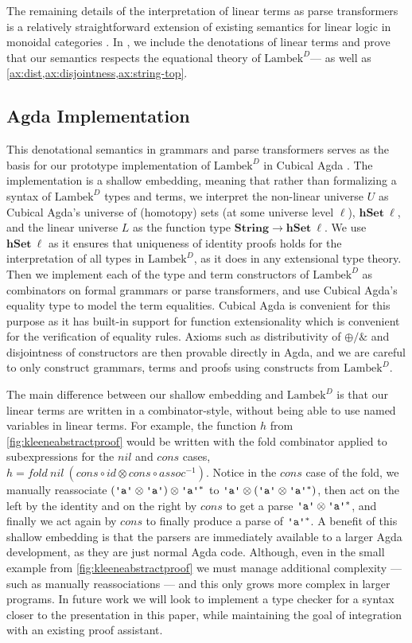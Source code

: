 \documentclass[acmsmall,nonacm]{acmart}
\newcommand{\StringSem}{\mathbf{String}}
\newcommand{\hSet}{\mathbf{hSet}}
\newcommand{\theoryabbv}{$\textrm{Lambek}^D$\xspace}
\newcommand{\literal}[1]{\texttt{\textquotesingle#1\textquotesingle}}
\newcommand{\agdalogo}{%
  \usebox{\logoagdabox}}%
\newcommand{\zenodolink}{https://zenodo.org/records/15049780}
\newcommand{\Agda}{\href{\zenodolink}{\agdalogo}}
\begin{document}
The remaining details of the interpretation of linear terms as parse
transformers is a relatively straightforward extension of existing semantics for
linear logic in monoidal categories \cite{seely89}. In
\fi, we include the denotations
of linear terms and prove that our semantics respects the equational theory of
\theoryabbv --- as well as \cref{ax:dist,ax:disjointness,ax:string-top}.

\subsection{Agda Implementation \Agda}
\label{subsec:impl}
This denotational semantics in grammars and parse transformers serves
as the basis for our prototype implementation of \theoryabbv in
Cubical Agda \cite{schaefer_2025_15243560}. The implementation is a shallow embedding, meaning that
rather than formalizing a syntax of \theoryabbv types and terms, we interpret
the non-linear universe $U$ as Cubical Agda's universe of (homotopy) sets (at
some universe level $\ell$), $\hSet~\ell$, and the linear universe $L$ as the
function type
$\StringSem \to \hSet~\ell$. We use $\hSet~\ell$ as it ensures that uniqueness of identity proofs holds for the interpretation of all types in \theoryabbv, as it does in any extensional type theory. Then we implement each of the type and
term constructors of \theoryabbv as combinators on formal grammars or
parse transformers, and use Cubical Agda's equality type to model the
term equalities. Cubical Agda is convenient for this purpose as it has
built-in support for function extensionality which is convenient for the verification of equality rules. Axioms such as distributivity of $\oplus/\&$ and
disjointness of constructors are then provable directly in Agda, and
we are careful to only construct grammars, terms and proofs using
constructs from \theoryabbv.

The main difference
between our shallow embedding and \theoryabbv is that our linear terms
are written in a combinator-style, without being able to use named
variables in linear terms. For example, the function $h$ from
\cref{fig:kleeneabstractproof} would be written with the fold combinator applied
to subexpressions for the $nil$ and $cons$ cases,
\(
h = fold~nil~(cons \circ id \otimes cons \circ assoc^{-1})
\). Notice in the $cons$ case of the fold, we manually reassociate
$(\literal{a} \otimes \literal{a}) \otimes \literal{a}^{*}$ to
$\literal{a} \otimes (\literal{a} \otimes \literal{a}^{*})$, then act on the
left by the identity and on the right by $cons$ to get a parse
$\literal{a} \otimes \literal{a}^{*}$, and finally we act again by $cons$ to
finally produce a parse of $\literal{a}^{*}$.
A benefit of this shallow embedding is that
the parsers are immediately available to a larger Agda development, as
they are just normal Agda code. Although, even in the small example from
\cref{fig:kleeneabstractproof} we must manage additional complexity --- such as
manually reassociations --- and
this only grows more complex in larger programs. In future work we will look to
implement a type checker for a syntax closer to the presentation in
this paper, while maintaining the goal of integration with an
existing proof assistant.
\end{document}
